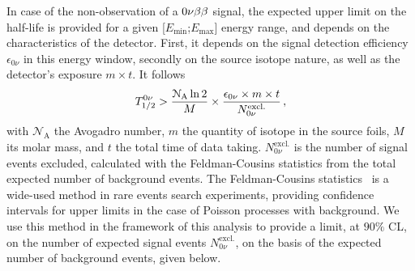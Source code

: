 In case of the non-observation of a $0\nu\beta\beta$ signal, the expected upper limit on the half-life is provided for a given [$E_{\text{min}}$;$E_{\text{max}}$] energy range, and depends on the characteristics of the detector.
First, it depends on the signal detection efficiency $\epsilon_{0\nu}$ in this energy window, secondly on the source isotope nature, as well as the detector's exposure $m\times t$.
It follows
\begin{equation}
  T_{1/2}^{0\nu} > \frac{\mathcal{N}_{\text{A}}\ln{2}}{M}\times \frac{\epsilon_{0\nu}\times m\times t}{N_{0\nu}^{\text{excl.}}}\,,
  \label{eq:tbeta_limit}
\end{equation}
with $\mathcal{N}_{\text{A}}$ the Avogadro number, $m$ the quantity of isotope in the source foils, $M$ its molar mass, and $t$ the total time of data taking.
$N_{0\nu}^{\text{excl.}}$ is the number of signal events excluded, calculated with the Feldman-Cousins statistics from the total expected number of background events.
The Feldman-Cousins statistics~\cite{art:feld-cous} is a wide-used method in rare events search experiments, providing confidence intervals for upper limits in the case of Poisson processes with background.
We use this method in the framework of this analysis to provide a limit, at $90\%$ CL, on the number of expected signal events $N_{0\nu}^{\text{excl.}}$, on the basis of the expected number of background events, given below.
